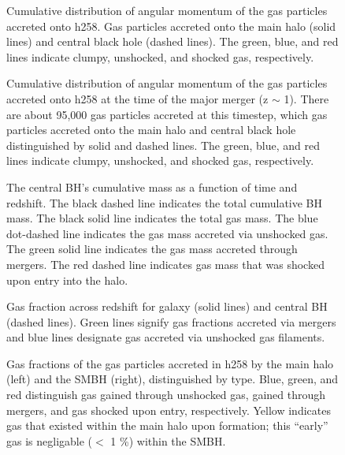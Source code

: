 \documentclass[12pt,headA,chapB]{fiskthesis}
\begin{document}
\begin{figure}
\centerline{}
\caption[GASOLINE h258 Cumulative Angular Momentum Distribution]{ Cumulative distribution of angular momentum of the gas particles accreted onto h258.  Gas particles accreted onto the main halo (solid lines) and central black hole (dashed lines). The green, blue, and red lines indicate clumpy, unshocked, and shocked gas, respectively.}
\label{h258angmom} 
\end{figure}

\begin{figure}
\centerline{}
\caption[GASOLINE h258 Merger Angular Momentum Distribution]{ Cumulative distribution of angular momentum of the gas particles accreted onto h258 at the time of the major merger (z $\sim$ 1). There are about 95,000 gas particles accreted at this timestep, which gas particles accreted onto the main halo and central black hole distinguished by solid and dashed lines. The green, blue, and red lines indicate clumpy, unshocked, and shocked gas, respectively.}
\label{h258angmom_merger} 
\end{figure}

\begin{figure}
\centerline{}
\caption[GASOLINE h277 SMBH Cumulative Mass]{The central BH’s cumulative mass as a function of time and redshift. The black dashed line indicates the total cumulative BH mass. The black solid line indicates the total gas mass. The blue dot-dashed line indicates the gas mass accreted via unshocked gas. The green solid line indicates the gas mass accreted through mergers. The red dashed line indicates gas mass that was shocked upon entry into the halo.}
\label{h277allmassgas} 
\end{figure}

\begin{figure}
\centerline{}
\caption[GASOLINE h258 Galaxy and SMBH Gas Fractions Across Time]{Gas fraction across redshift for galaxy (solid lines) and central BH (dashed lines). Green lines signify gas fractions accreted via mergers and blue lines designate gas accreted via unshocked gas filaments.}
\label{h277numfrac} 
\end{figure}

\begin{figure}
\centerline{}
\caption[GASOLINE h258 Galaxy and SMBH Gas Fractions at z=0]{Gas fractions of the gas particles accreted in h258 by the main halo (left) and the SMBH (right), distinguished by type. Blue, green, and red distinguish gas gained through unshocked gas, gained through mergers, and gas shocked upon entry, respectively. Yellow indicates gas that existed within the main halo upon formation; this ``early'' gas is negligable ($<$ 1 \%) within the SMBH.}
\label{h277stackfrac} 
\end{figure}
\end{document}
